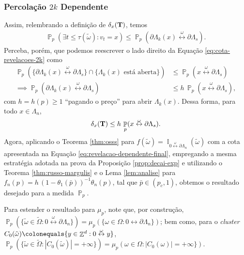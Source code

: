 \documentclass[9pt]{beamer}
\theoremstyle{definition} %
\DeclareMathOperator{\PX}{\mathbb{P}} %
\DeclareMathOperator{\ZX}{\mathbb{Z}} %
\DeclareMathOperator{\IX}{\mathbb{I}} %
\begin{document}
	\begin{frame}[t]
	\frametitle{Percolação $2k$ Dependente}
		Assim, relembrando a definição de $\delta_x(\text{\textbf{T}})$, temos
		\begin{align}\label{eq:cota-revelacoes-2k}
			\PX_p(\exists t \leq \tau(\tilde{\omega}) : v_t = x) \leq \PX_p(\partial\Lambda_k(x) \overset{\omega}{\leftrightarrow} \partial\Lambda_s).
		\end{align}\pause
		Perceba, porém, que podemos reescrever o lado direito da Equação \ref{eq:cota-revelacoes-2k} como
		\begin{align*}
		\PX_p(\{\partial\Lambda_k(x) \overset{\omega}{\leftrightarrow} \partial\Lambda_s\} \cap \{\Lambda_k(x) \text{ está aberta}\}) &\leq \PX_p(x \overset{\omega}{\leftrightarrow} \partial\Lambda_s) \\
		\implies \PX_p(\partial\Lambda_k(x) \overset{\omega}{\leftrightarrow} \partial\Lambda_s) & \leq h \, \PX_p(x \overset{\omega}{\leftrightarrow} \partial\Lambda_s),
		\end{align*}
		com $h = h(p) \geq 1$ ``pagando o preço'' para abrir $\Lambda_k(x)$. Dessa forma, para todo $x \in \Lambda_n$,
		\begin{align} \label{eq:revelacao-dependente-final}
		\delta_x(\text{\textbf{T}}) \leq h \, \PX_p(x \overset{\omega}{\leftrightarrow} \partial\Lambda_s).
		\end{align}\pause
		Agora, aplicando o Teorema \ref{thm:osss} para $f(\tilde{\omega}) = \IX_{0\overset{\omega}{\leftrightarrow}\partial\Lambda_n}(\tilde{\omega})$ com a cota apresentada na Equação \ref{eq:revelacao-dependente-final}, empregando a mesma estratégia adotada na prova da Proposição \ref{prop:decai-exp} e utilizando o Teorema \ref{thm:russo-margulis} e o Lema \ref{lem:analise} para $f_n(p) = h\, (1 - \theta_1(\bar{p}))^{-1}\theta_n(p)$, tal que $\bar{p} \in (p_c, 1)$, obtemos o resultado desejado para a medida $\PX_p$.\pause
		
		Para estender o resultado para $\mu_p$, note que, por construção, $\PX_p(\{\tilde{\omega} \in \tilde{\Omega} : 0 \overset{\omega}{\leftrightarrow} \partial\Lambda_n\}) = \mu_p(\{\omega \in \Omega : 0 \leftrightarrow \partial\Lambda_n\})$; bem como, para o \textit{cluster} $C_0(\tilde{\omega}) \colonequals \{y \in \ZX^d : 0 \overset{\omega}{\leftrightarrow} y\}$, $\PX_p(\{\tilde{\omega} \in \tilde{\Omega} : |C_0(\tilde{\omega})| = +\infty\}) = \mu_p(\omega \in \Omega : |C_0(\omega)| = +\infty\})$.
	\end{frame}
\end{document}
